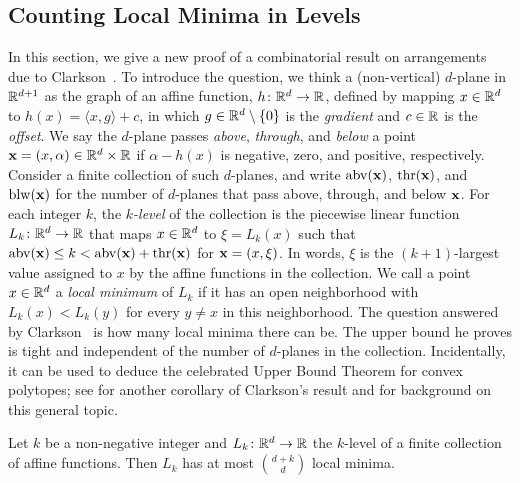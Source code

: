 \documentclass[a4paper,UKenglish,cleveref, autoref,numberwithinsect]{socg-lipics-v2021}
\newcommand {\mm}[1] {\ifmmode{#1}\else{\mbox{\(#1\)}}\fi}
\newcommand {\scalprod}[2] {{\langle #1 , #2 \rangle}}
\theoremstyle{plain}
\newcommand{\Rspace}        {\mm{{\mathbb R}}}
\newcommand{\xxx}           {\mm{\bf{x}}}
\newcommand{\Above}[1]      {\mm{{\rm abv}{({#1})}}}
\newcommand{\Through}[1]    {\mm{{\rm thr}{({#1})}}}
\newcommand{\Below}[1]      {\mm{{\rm blw}{({#1})}}}
\begin{document}
\subsection{Counting Local Minima in Levels}
\label{sec:4.2}
In this section, we give a new proof of a combinatorial result on arrangements due to Clarkson~\cite{Cla93}.
To introduce the question, we think a (non-vertical) $d$-plane in $\Rspace^{d+1}$ as the graph of an affine function, $h \colon \Rspace^d \to \Rspace$, defined by mapping $x \in \Rspace^d$ to $h(x) = \scalprod{x}{g} + c$, in which $g \in \Rspace^d \setminus \{0\}$ is the \emph{gradient} and $c \in \Rspace$ is the \emph{offset}.
We say the $d$-plane passes \emph{above}, \emph{through}, and \emph{below} a point $\xxx = (x, \alpha) \in \Rspace^d \times \Rspace$ if $\alpha - h(x)$ is negative, zero, and positive, respectively.
%
Consider a finite collection of such $d$-planes, and write $\Above{\xxx}$, $\Through{\xxx}$, and $\Below{\xxx}$ for the number of $d$-planes that pass above, through, and below $\xxx$.
For each integer $k$, the \emph{$k$-level} of the collection is the piecewise linear function $L_k \colon \Rspace^d \to \Rspace$ that maps $x \in \Rspace^d$ to $\xi = L_k(x)$ such that $\Above{\xxx} \leq k < \Above{\xxx} + \Through{\xxx}$ for $\xxx = (x, \xi)$.
In words, $\xi$ is the $(k+1)$-largest value assigned to $x$ by the affine functions in the collection.
\smallskip
We call a point $x \in \Rspace^d$ a \emph{local minimum} of $L_k$ if it has an open neighborhood with $L_k(x) < L_k(y)$ for every $y \neq x$ in this neighborhood.
The question answered by Clarkson~\cite{Cla93} is how many local minima there can be.
The upper bound he proves is tight and independent of the number of $d$-planes in the collection.
Incidentally, it can be used to deduce the celebrated Upper Bound Theorem for convex polytopes; see \cite{ANPS93} for another corollary of Clarkson's result and \cite{Zie95} for background on this general topic.
\begin{proposition}
  \label{prop:counting_minima_in_levels}
  Let $k$ be a non-negative integer and $L_k \colon \Rspace^d \to \Rspace$ the $k$-level of a finite collection of affine functions.
  Then $L_k$ has at most $\binom{d+k}{d}$ local minima.
\end{proposition}
\end{document}
